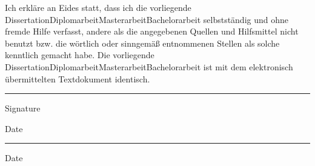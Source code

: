 Ich erkläre an Eides statt, dass ich die vorliegende {\ifcase\type Dissertation\or Diplomarbeit\or Masterarbeit\or Bachelorarbeit\fi} selbstständig und ohne fremde Hilfe verfasst, andere als die angegebenen Quellen und Hilfsmittel nicht benutzt bzw. die wörtlich oder sinngemäß entnommenen Stellen als solche kenntlich gemacht habe.
Die vorliegende {\ifcase\type Dissertation\or Diplomarbeit\or Masterarbeit\or Bachelorarbeit\fi} ist mit dem elektronisch übermittelten Textdokument identisch.


\vspace{4.5cm}
\parbox{8cm}{\hrule
\strut \footnotesize Signature} \hfill\parbox{3cm}{Date \vspace{0.1cm}\hrule
\strut \footnotesize Date}
